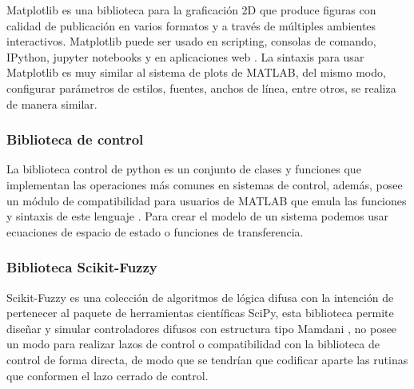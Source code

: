             Matplotlib es una biblioteca para la graficación 2D que produce figuras con calidad de publicación en varios formatos y a través de múltiples ambientes interactivos. Matplotlib puede ser usado en scripting, consolas de comando, IPython, jupyter notebooks y en aplicaciones web \Parencite{Hunter:2007}. La sintaxis para usar Matplotlib es muy similar al sistema de plots de MATLAB, del mismo modo, configurar parámetros de estilos, fuentes, anchos de línea, entre otros, se realiza de manera similar.

        \subsubsection{Biblioteca de control}

            La biblioteca control de python es un conjunto de clases y funciones que implementan las operaciones más comunes en sistemas de control, además, posee un módulo de compatibilidad para usuarios de MATLAB que emula las funciones y sintaxis de este lenguaje \Parencite{pythoncontrol}. Para crear el modelo de un sistema podemos usar ecuaciones de espacio de estado o funciones de transferencia.

        \subsubsection{Biblioteca Scikit-Fuzzy}
            
            Scikit-Fuzzy es una colección de algoritmos de lógica difusa con la intención de pertenecer al paquete de herramientas científicas SciPy, esta biblioteca permite diseñar y simular controladores difusos con estructura tipo Mamdani \Parencite{warner2016fuzzy}, no posee un modo para realizar lazos de control o compatibilidad con la biblioteca de control de forma directa, de modo que se tendrían que codificar aparte las rutinas que conformen el lazo cerrado de control.